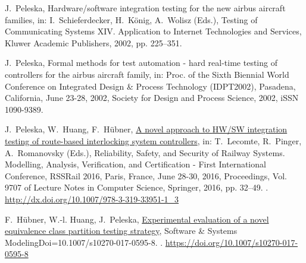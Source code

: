 \documentclass[3p,times]{elsarticle}
\begin{document}
\begin{thebibliography}{10}
J.~Peleska, Hardware/software integration testing for the new airbus aircraft
  families, in: I.~Schieferdecker, H.~K{\"o}nig, A.~Wolisz (Eds.), {Testing of
  Communicating Systems XIV. Application to Internet Technologies and
  Services}, Kluwer Academic Publishers, 2002, pp. 225--351.

J.~Peleska, Formal methods for test automation - hard real-time testing of
  controllers for the airbus aircraft family, in: Proc. of the Sixth Biennial
  World Conference on Integrated Design \& Process Technology (IDPT2002),
  Pasadena, California, June 23-28, 2002, Society for Design and Process
  Science, 2002, iSSN 1090-9389.

J.~Peleska, W.~Huang, F.~H{\"{u}}bner,
  \href{http://dx.doi.org/10.1007/978-3-319-33951-1_3}{A novel approach to
  {HW/SW} integration testing of route-based interlocking system controllers},
  in: T.~Lecomte, R.~Pinger, A.~Romanovsky (Eds.), Reliability, Safety, and
  Security of Railway Systems. Modelling, Analysis, Verification, and
  Certification - First International Conference, RSSRail 2016, Paris, France,
  June 28-30, 2016, Proceedings, Vol. 9707 of Lecture Notes in Computer
  Science, Springer, 2016, pp. 32--49.
\newblock \href {http://dx.doi.org/10.1007/978-3-319-33951-1_3}
  {}.
\newline\urlprefix\url{http://dx.doi.org/10.1007/978-3-319-33951-1_3}

F.~H{\"u}bner, W.-l. Huang, J.~Peleska,
  \href{https://doi.org/10.1007/s10270-017-0595-8}{Experimental evaluation of a
  novel equivalence class partition testing strategy}, Software {\&} Systems
  ModelingDoi=10.1007/s10270-017-0595-8.
\newblock \href {http://dx.doi.org/10.1007/s10270-017-0595-8}
  {}.
\newline\urlprefix\url{https://doi.org/10.1007/s10270-017-0595-8}


\end{thebibliography}

\end{document}
